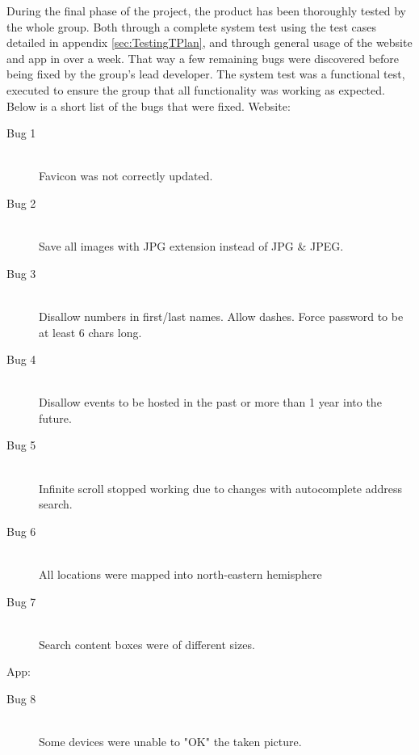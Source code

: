 During the final phase of the project, the product has been thoroughly tested by the whole group. Both through a complete system test using the test cases detailed in appendix \ref{sec:TestingTPlan}, and through general usage of the website and app in over a week. That way a few remaining bugs were discovered before being fixed by the group's lead developer. The system test was a functional test, executed to ensure the group that all functionality was working as expected. Below is a short list of the bugs that were fixed.
\medskip
Website: 
\begin{description}
  \item[Bug 1] \hfill \\
  Favicon was not correctly updated.
  \item[Bug 2] \hfill \\
  Save all images with JPG extension instead of JPG \& JPEG.
  \item[Bug 3] \hfill \\
  Disallow numbers in first/last names. Allow dashes. Force password to be at least 6 chars long.
  \item[Bug 4] \hfill \\
  Disallow events to be hosted in the past or more than 1 year into the future.
  \item[Bug 5] \hfill \\
  Infinite scroll stopped working due to changes with autocomplete address search.
  \item[Bug 6] \hfill \\
  All locations were mapped into north-eastern hemisphere
  \item[Bug 7] \hfill \\
  Search content boxes were of different sizes.
\end{description}
\medskip
App: 
\begin{description}
  \item[Bug 8] \hfill \\
  Some devices were unable to "OK" the taken picture.
\end{description}
%
